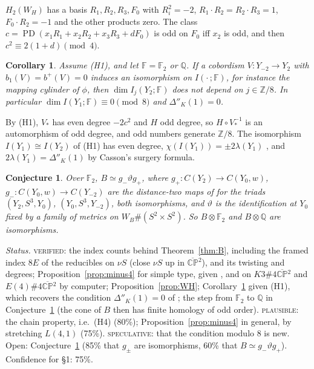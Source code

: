 \documentclass[10pt]{amsart}
\makeatletter
\numberwithin{equation}{section}
\theoremstyle{compact}
\newtheorem{corollary}[theorem]{Corollary}
\newtheorem{conjecture}[theorem]{Conjecture}
\renewenvironment{proof}[1][\proofname]{\par\pushQED{\qed}\normalfont
  \topsep4\p@\relax\trivlist\item[\hskip\labelsep\itshape#1\@addpunct{.}]%
  \ignorespaces}{\popQED\endtrivlist\@endpefalse}
\newcommand{\CPb}{\overline{\mathbb{CP}}{}^2}
\newcommand{\Z}{\mathbb Z}
\newcommand{\Q}{\mathbb Q}
\newcommand{\F}{\mathbb F}
\newcommand{\PD}{\operatorname{PD}}
\newcommand{\step}[1]{\par\noindent\textit{#1}\enspace}
\newcommand{\ver}{\textsc{verified}}
\newcommand{\pla}{\textsc{plausible}}
\newcommand{\spe}{\textsc{speculative}}
\makeatother
\begin{document}
\begin{proof}
$H_2(W_H)$ has a basis $R_1,R_2,R_3,F_0$ with $R_i^2=-2$, $R_1\cdot
R_2=R_2\cdot R_3=1$, $F_0\cdot R_2=-1$ and the other products zero. The class
$c=\PD(x_1R_1+x_2R_2+x_3R_3+dF_0)$ is odd on $F_0$ iff $x_2$ is odd, and then
$c^2\equiv2(1+d)\pmod 4$.
\end{proof}

\begin{corollary}\label{cor:grading}
Assume \textup{(H1)}, and let $\F=\F_2$ or $\Q$. If a cobordism $V\colon
Y_{-2}\to Y_2$ with $b_1(V)=b^+(V)=0$ induces an isomorphism on $I(\cdot\,;\F)$,
for instance the mapping cylinder of $\phi$, then $\dim I_j(Y_2;\F)$ does not
depend on $j\in\Z/8$. In particular $\dim I(Y_1;\F)\equiv0\pmod8$ and
$\Delta''_K(1)=0$.
\end{corollary}

\begin{proof}
By (H1), $V_*$ has even degree $-2c^2$ and $H$ odd degree, so $H\circ V_*^{-1}$
is an automorphism of odd degree, and odd numbers generate $\Z/8$. The isomorphism
$I(Y_1)\cong I(Y_2)$ of (H1) has even degree, $\chi(I(Y_1))=\pm2\lambda(Y_1)$
\cite{T1}, and $2\lambda(Y_1)=\Delta''_K(1)$ by Casson's surgery formula.
\end{proof}

\begin{conjecture}\label{conj:B}
Over $\F_2$, $B\simeq g_-\vartheta g_+$, where $g_+\colon C(Y_2)\to C(Y_0,w)$,
$g_-\colon C(Y_0,w)\to C(Y_{-2})$ are the distance-two maps of
\cite[Prop.~3.10]{DLME} for the triads $(Y_2,S^3,Y_0)$, $(Y_0,S^3,Y_{-2})$, both
isomorphisms, and $\vartheta$ is the identification at $Y_0$ fixed by a family
of metrics on $W_B\#(S^2\times S^2)$. So $B\otimes\F_2$ and $B\otimes\Q$ are
isomorphisms.
\end{conjecture}

\step{Status.} \ver: the index counts behind Theorem~\ref{thm:B}, including the
framed index $8E$ of the reducibles on $\nu S$ (close $\nu S$ up in $\CPb$), and
its twisting and degrees; Proposition~\ref{prop:minus4} for simple type, given
\cite[Thms.~4.1, 4.3]{FS2}, and on $K3\#4\CPb$ and $E(4)\#4\CPb$ by computer;
Proposition~\ref{prop:WH}; Corollary~\ref{cor:grading} given (H1), which recovers
the condition $\Delta''_K(1)=0$ of \cite{BL}; the step from $\F_2$ to $\Q$ in
Conjecture~\ref{conj:B} (the cone of $B$ then has finite homology of odd order).
\pla: the chain
property, i.e.\ (H4) (80\%); Proposition~\ref{prop:minus4} in general, by
stretching $L(4,1)$ (75\%). \spe: that the condition modulo $8$ is new. Open:
Conjecture~\ref{conj:B} (85\% that $g_\pm$ are isomorphisms, 60\% that $B\simeq
g_-\vartheta g_+$). Confidence for \S1: 75\%.
\end{document}
